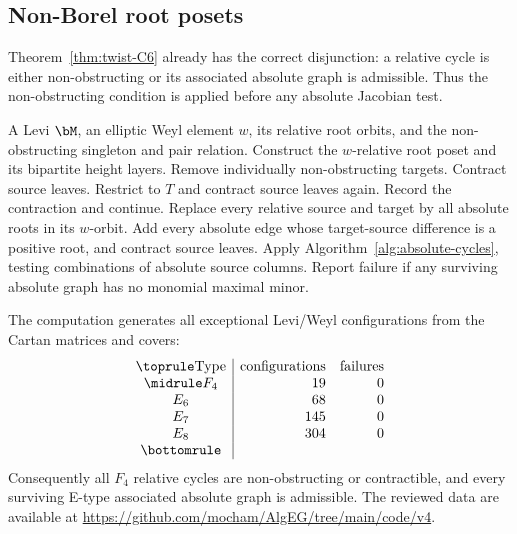 \subsection{Non-Borel root posets}

Theorem~\ref{thm:twist-C6} already has the correct disjunction: a relative
cycle is either non-obstructing or its associated absolute graph is
admissible.  Thus the non-obstructing condition is applied before any absolute
Jacobian test.

\begin{tcolorbox}
\begin{algorithmic}[1]
\Require A Levi $\bM$, an elliptic Weyl element $w$, its relative root orbits,
and the non-obstructing singleton and pair relation.
\State Construct the $w$-relative root poset and its bipartite height layers.
\State Remove individually non-obstructing targets.
  \State Contract source leaves.
    \State Restrict to $T$ and contract source leaves again.
      \State Record the contraction and continue.
    \EndIf
    \State Replace every relative source and target by all absolute roots in
    its $w$-orbit.
    \State Add every absolute edge whose target-source difference is a
    positive root, and contract source leaves.
      \State Apply Algorithm~\ref{alg:absolute-cycles}, testing combinations
      of absolute source columns.
    \EndIf
  \EndFor
\EndFor
\State Report failure if any surviving absolute graph has no monomial maximal
minor.
\end{algorithmic}
\end{tcolorbox}
\renewcommand{\figurename}{Algorithm}
\label{alg:twisted-cycles}

The computation generates all exceptional Levi/Weyl configurations from the
Cartan matrices and covers:
\[
\begin{array}{c|rr}
\toprule
\text{Type}&\text{configurations}&\text{failures}\\
\midrule
F_4&19&0\\
E_6&68&0\\
E_7&145&0\\
E_8&304&0\\
\bottomrule
\end{array}
\]
Consequently all $F_4$ relative cycles are non-obstructing or contractible,
and every surviving E-type associated absolute graph is admissible.  The
reviewed data are available at
\url{https://github.com/mocham/AlgEG/tree/main/code/v4}.
